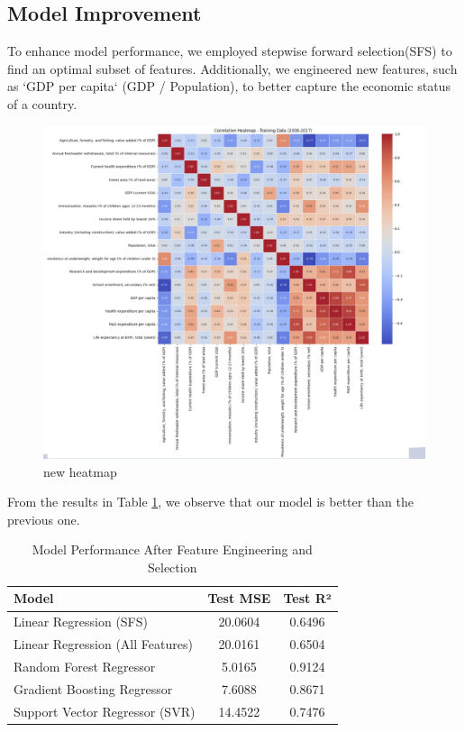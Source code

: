 \documentclass{article}
\begin{document}
\subsection{Model Improvement}
\label{ssec:model_improvement}


To enhance model performance, we employed stepwise forward selection(SFS) \cite{Efroymson1960} to find an optimal subset 
of features. Additionally, we engineered new features, such as `GDP per capita` (GDP / Population), 
to better capture the economic status of a country.

\begin{figure}[h]
    \centering
    \includegraphics[width=0.8\columnwidth]{./pic/T1.c.2.png} %
    \caption{new heatmap}
    \label{fig:correlation_heatmap}
\end{figure}

From the results in Table \ref{tab:model_performance_improved}, we observe that our model is better than the previous one.

\begin{table}[h]
    \centering
    \caption{Model Performance After Feature Engineering and Selection}
    \label{tab:model_performance_improved}
    \begin{tabular}{|l|c|c|}
        \hline
        \textbf{Model} & \textbf{Test MSE} & \textbf{Test R²} \\
        \hline
        Linear Regression (SFS) & 20.0604 & 0.6496 \\
        Linear Regression (All Features) & 20.0161 & 0.6504 \\
        Random Forest Regressor & 5.0165 & 0.9124 \\
        Gradient Boosting Regressor & 7.6088 & 0.8671 \\
        Support Vector Regressor (SVR) & 14.4522 & 0.7476 \\
        \hline
    \end{tabular}
\end{table}
\end{document}
